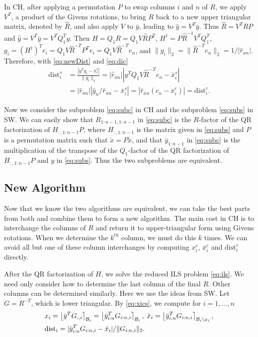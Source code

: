 \documentclass[12pt,Bold,letterpaper]{mcgilletdclass}
\newcommand{\dist}{\mathrm{dist}}
\begin{document}
In CH, after applying a permutation $P$ to swap columns $i$ and $n$ of $R$,  
we apply $V^T$, a product of the Givens rotations, to bring $R$ back to a new upper triangular
matrix, denoted by $\hat{R}$, and also apply $V$ to $\bar{y}$, 
leading to  $\hat{y} = V^T\bar{y}$. 
Thus  $\hat{R}=V^T RP$ and $\hat{y} = V^T\bar{y}=V^TQ_1^Ty$. 
Then $H=Q_1R= Q_1V\hat{R}P^T$, $H^\dag= P\hat{R}^{-1}V^TQ_1^T$, 
$g_i=(H^\dag)^Te_i=Q_1V\hat{R}^{-T}P^Te_i=Q_1V\hat{R}^{-T}e_n$,
and $\|g_i\|_2=\|\hat{R}^{-T}e_n\|_2=1/|\hat{r}_{nn}|$.
Therefore, with \eqref{eq:newDist} and \eqref{eq:dic}
\begin{align}
\dist_i^s
&=\frac{ | y^Tg_i - \bar{x}_i^s   |}{  \| g_i   \|_2} 
=|\hat{r}_{nn}||y^TQ_1V\hat{R}^{-T}e_n- \bar{x}_i^s  |  \label{eq:disc} \\
& = |\hat{r}_{nn}|| \hat{y}_n/\hat{r}_{nn} - \bar{x}_i^s | 
 = |\hat{r}_{nn}(c_n-\bar{x}_i^c)| =\dist_i^c.  \nonumber
\end{align}

Now we consider  the subproblem \eqref{eq:subc} in CH and the subproblem \eqref{eq:subs} in SW.
We can easily show that $R_{1:n-1,1:n-1}$ in  \eqref{eq:subc} is the $R$-factor of the QR factorization
of $H_{:,1:n-1}P$, where $H_{:,1:n-1}$ is the matrix given in \eqref{eq:subs}
and $P$ is a permutation matrix such that $\check{x}=P\tilde{x}$,
and that $\bar{y}_{1:n-1}$ in  \eqref{eq:subc} is the multiplication of the transpose of 
the $Q_1$-factor of the QR factorization of $H_{:,1:n-1}P$ and $y$ in \eqref{eq:subs}.
Thus the two subproblems are equivalent. 

\subsection{New Algorithm} \label{subsec:newReduction}
Now that we know the two algorithms are equivalent, we can take the best
parts from both and combine them to form a new algorithm. 
The main cost in CH is to interchange the columns of $R$ and return it to
upper-triangular form using Givens rotations. 
When we determine the $k^{th}$ column,  we must do this $k$ times. 
We can avoid all but one of these column interchanges by computing $x_i^c$, 
$\bar{x}_i^c$ and $\dist_i^c$ directly. 

After the QR factorization of $H$, we  solve the reduced ILS problem \eqref{eq:ils}.
We need only consider how to determine the last column of the final $R$.
Other columns can be determined similarly. 
Here we use the ideas from SW.
Let $G=R^{-T}$, which is lower triangular.
By \eqref{eq:xics}, we compute for $i=1,\ldots, n$
\begin{align*}
& x_i = \left \lfloor \bar{y}^TG_{:,i} \right \rceil_{{\cal B}_i} 
=\left \lfloor \bar{y}_{i:n}^T G_{i:n,i} \right \rceil_{{\cal B}_i}, \;
\bar{x}_i=\left \lfloor \bar{y}_{i:n}^T G_{i:n,i} \right \rceil_{{\cal B}_i\backslash x_i}, \\
& \dist_i = |\bar{y}_{i:n}^T G_{i:n,i}-\bar{x}_i|/\|G_{i:n,i}\|_2.
\end{align*}
\end{document}
